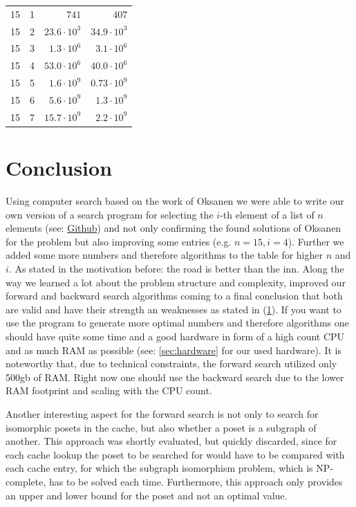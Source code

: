 \documentclass[10pt,journal,compsoc]{IEEEtran}
\begin{document}
\begin{table}[!t]
\begin{tabular}{c|c|r|r}
    15         & 1          & $741$                   & $407$                    \\
    15         & 2          & $23.6 \cdot 10^3$       & $34.9 \cdot 10^3$        \\
    15         & 3          & $1.3 \cdot 10^6$        & $3.1 \cdot 10^6$         \\
    15         & 4          & $53.0 \cdot 10^6$       & $40.0 \cdot 10^6$        \\
    15         & 5          & $1.6 \cdot 10^9$        & $0.73 \cdot 10^9$        \\
    15         & 6          & $5.6 \cdot 10^9$        & $1.3 \cdot 10^9$         \\
    15         & 7          & $15.7 \cdot 10^9$       & $2.2 \cdot 10^9$         \\
  \end{tabular}
\end{table}


\section{Conclusion}
Using computer search based on the work of Oksanen we were able to write our own version of a search program for selecting the $i$-th element of a list of $n$ elements (see: \href{https://github.com/JGDoerrer/selection_generator}{Github}) and not only confirming the found solutions of Oksanen for the problem but also improving some entries (e.g. $n = 15, i = 4$).
Further we added some more numbers and therefore algorithms to the table for higher $n$ and $i$.
As stated in the motivation before: the road is better than the inn.
Along the way we learned a lot about the problem structure and complexity, improved our forward and backward search algorithms coming to a final conclusion that both are valid and have their strength an weaknesses as stated in (\ref{}). %
If you want to use the program to generate more optimal numbers and therefore algorithms one should have quite some time and a good hardware in form of a high count CPU and as much RAM as possible (see: \ref{sec:hardware} for our used hardware).
It is noteworthy that, due to technical constraints, the forward search utilized only 500gb of RAM. %
Right now one should use the backward search due to the lower RAM footprint and scaling with the CPU count.

Another interesting aspect for the forward search is not only to search for isomorphic posets in the cache, but also whether a poset is a subgraph of another.
This approach was shortly evaluated, but quickly discarded, since for each cache lookup the poset to be searched for would have to be compared with each cache entry, for which the subgraph isomorphism problem, which is NP-complete, has to be solved each time.
Furthermore, this approach only provides an upper and lower bound for the poset and not an optimal value.
\end{document}
